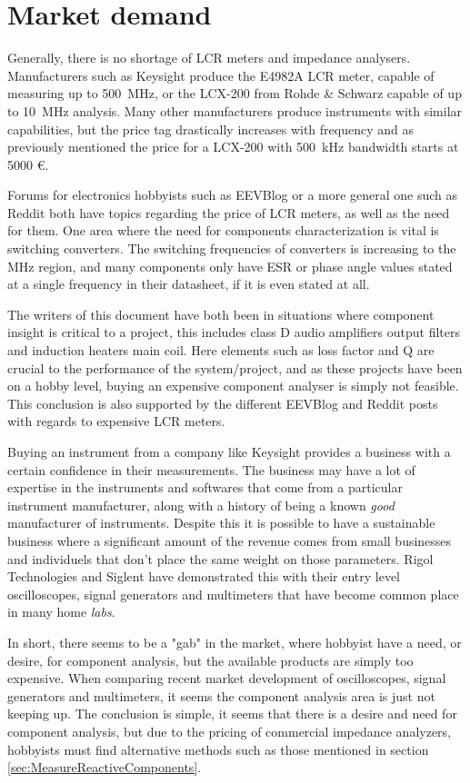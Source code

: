 \section{Market demand} \label{sec:ProfessionalMarketDemand}
Generally, there is no shortage of LCR meters and impedance analysers. Manufacturers such as Keysight produce the E4982A LCR meter,
 capable of measuring up to \SI{500}{\mega\hertz}, or the LCX-200 from Rohde \& Schwarz capable of up to \SI{10}{\mega\hertz}
analysis. Many other manufacturers produce instruments with similar capabilities, but the price tag drastically increases with frequency
and as previously mentioned the price for a LCX-200 with \SI{500}{\kilo\hertz} bandwidth starts at 5000 €. 

Forums for electronics hobbyists such as EEVBlog\cite{EevblogLCR} or a more general one such as Reddit\cite{RedditLCR} both have topics regarding the price of LCR
meters, as well as the need for them. One area where the need for components
characterization is vital is switching converters. The switching frequencies of converters is increasing to the MHz region, and 
many components only have ESR or phase angle values stated at a single frequency in their datasheet, if it is even stated at all.

The writers of this document have both been in situations where component insight is critical to a project, this includes class D
audio amplifiers output filters and induction heaters main coil. Here elements such as loss factor and Q are crucial to the performance
of the system/project, and as these projects have been on a hobby level, buying an expensive component analyser is simply not feasible.
This conclusion is also supported by the different EEVBlog and Reddit posts with regards to expensive LCR meters.

Buying an instrument from a company like Keysight provides a business with a certain confidence in their measurements. The business may have a lot of expertise in the instruments and softwares that come from a particular instrument manufacturer, along with a history of being a known \textit{good} manufacturer of instruments. Despite this it is possible to have a sustainable business where a significant amount of the revenue comes from small businesses and individuels that don't place the same weight on those parameters. Rigol Technologies and Siglent have demonstrated this with their entry level oscilloscopes, signal generators and multimeters that have become common place in many home \textit{labs}. 

In short, there seems to be a "gab" in the market, where hobbyist have a need, or desire, for component analysis, but the available
products are simply too expensive. When comparing recent market development of oscilloscopes, signal generators and multimeters,
it seems the component analysis area is just not keeping up. The conclusion is simple, it seems that there is a desire and need for component analysis, but due to the pricing of commercial 
impedance analyzers, hobbyists must find alternative methods such as those mentioned in section \ref*{sec:MeasureReactiveComponents}. 